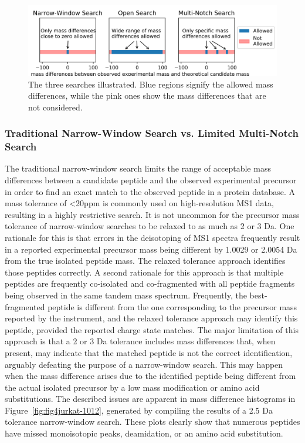 \documentclass[journal=jprobs,manuscript=article]{achemso}
\begin{document}
\begin{figure}[H]
\includegraphics{fig3-searchTypes.png}
\caption{The three searches illustrated. Blue regions signify the allowed mass differences, while the pink ones show the mass differences that are not considered.}
\label{fig:fig3-searchTypes}
\end{figure}

\subsubsection{Traditional Narrow-Window Search vs. Limited Multi-Notch Search}

The traditional narrow-window search limits the range of acceptable mass differences between a candidate peptide and the observed experimental precursor in order to find an exact match to the observed peptide in a protein database.
A mass tolerance of <20ppm is commonly used on high-resolution MS1 data, resulting in a highly restrictive search.
It is not uncommon for the precursor mass tolerance of narrow-window searches to be relaxed to as much as 2 or 3 Da.
One rationale for this is that errors in the deisotoping of MS1 spectra frequently result in a reported experimental precursor mass being different by 1.0029 or 2.0054 Da from the true isolated peptide mass.
The relaxed tolerance approach identifies those peptides correctly.
A second rationale for this approach is that multiple peptides are frequently co-isolated and co-fragmented with all peptide fragments being observed in the same tandem mass spectrum.
Frequently, the best-fragmented peptide is different from the one corresponding to the precursor mass reported by the instrument, and the relaxed tolerance approach may identify this peptide, provided the reported charge state matches.
The major limitation of this approach is that a 2 or 3 Da tolerance includes mass differences that, when present, may indicate that the matched peptide is not the correct identification, arguably defeating the purpose of a narrow-window search.
This may happen when the mass difference arises due to the identified peptide being different from the actual isolated precursor by a low mass modification or amino acid substitutions.
The described issues are apparent in mass difference histograms in Figure~\ref{fig:fig4jurkat-1012}, generated by compiling the results of a 2.5 Da tolerance narrow-window search.
These plots clearly show that numerous peptides have missed monoisotopic peaks, deamidation, or an amino acid substitution.
\end{document}
